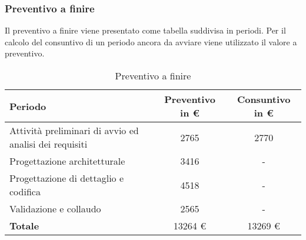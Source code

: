 \subsubsection{Preventivo a finire}
Il preventivo a finire viene presentato come tabella suddivisa in periodi. Per il calcolo del consuntivo di un periodo ancora da avviare viene utilizzato il valore a preventivo.
\begin{table}[h!] %
            \centering
            \renewcommand{\arraystretch}{2} %
            \begin{tabular}{|l|c|c|} %
                \rowcolor{orange!50} %
        		\hline
        		\textbf{Periodo} & \textbf{Preventivo in \euro} & \textbf{Consuntivo in \euro}\\
                \hline
                Attività preliminari di avvio ed analisi dei requisiti & 2765 & 2770\\
                \hline
                Progettazione architetturale & 3416 & -\\
                \hline
                Progettazione di dettaglio e codifica & 4518 & -\\
                \hline
                Validazione e collaudo & 2565 & -\\
                \hline
                \textbf{Totale} & 13264 \euro & 13269 \euro\\
                \hline
        \end{tabular}
        \caption{Preventivo a finire} %
        \label{tab:my_label}
\end{table}
